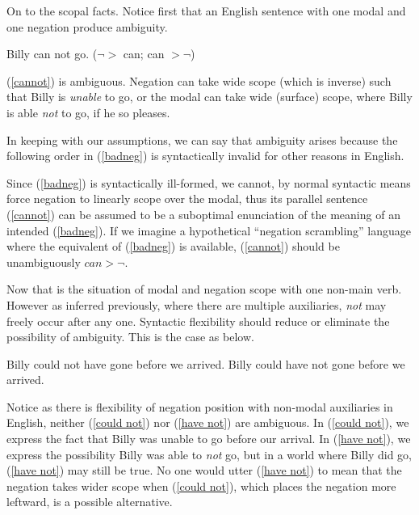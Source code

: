 \documentclass{article}
\begin{document}
On to the scopal facts. Notice first that an English sentence with one modal and one negation produce ambiguity.

\begin{exe}
\ex Billy can not go. \label{cannot}\hfill ($\neg >$ can; can $> \neg$)
\end{exe}

(\ref{cannot}) is ambiguous. Negation can take wide scope (which is inverse) such that Billy is \emph{unable} to go, or the modal can take wide (surface) scope, where Billy is able \emph{not} to go, if he so pleases.

In keeping with our assumptions, we can say that ambiguity arises because the following order in (\ref{badneg}) is syntactically invalid for other reasons in English.

\begin{exe}
\end{exe}

Since (\ref{badneg}) is syntactically ill-formed, we cannot, by normal syntactic means force negation to linearly scope over the modal, thus its parallel sentence (\ref{cannot}) can be assumed to be a suboptimal enunciation of the meaning of an intended (\ref{badneg}). If we imagine a hypothetical ``negation scrambling'' language where the equivalent of (\ref{badneg}) is available, (\ref{cannot}) should be unambiguously $can > \neg$.

Now that is the situation of modal and negation scope with one non-main verb. However as inferred previously, where there are multiple auxiliaries, \emph{not} may freely occur after any one. Syntactic flexibility should reduce or eliminate the possibility of ambiguity. This is the case as below.

\begin{exe}
\ex Billy could not have gone before we arrived.\label{could not}
\ex Billy could have not gone before we arrived.\label{have not}
\end{exe}

Notice as there is flexibility of negation position with non-modal auxiliaries in English, neither (\ref{could not}) nor (\ref{have not}) are ambiguous. In (\ref{could not}), we express the fact that Billy was unable to go before our arrival. In (\ref{have not}), we express the possibility Billy was able to \emph{not} go, but in a world where Billy did go, (\ref{have not}) may still be true.
No one would utter (\ref{have not}) to mean that the negation takes wider scope when (\ref{could not}), which places the negation more leftward, is a possible alternative.
\end{document}
